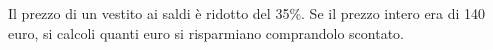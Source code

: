 Il prezzo di un vestito ai saldi è ridotto del 35\%. 
Se il prezzo intero era di 140 euro, si calcoli quanti euro si risparmiano
comprandolo scontato.